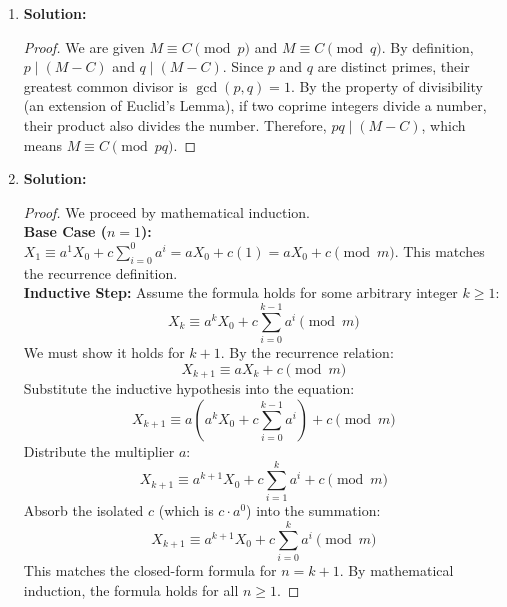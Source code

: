 \documentclass{article}
\begin{document}
\begin{enumerate}
\begin{proof}
        \begin{center}
        \end{center}
    \end{proof}

    \item \textbf{Solution:}
    \begin{proof}
        We are given $M \equiv C \pmod p$ and $M \equiv C \pmod q$. By definition, $p \mid (M - C)$ and $q \mid (M - C)$. Since $p$ and $q$ are distinct primes, their greatest common divisor is $\gcd(p, q) = 1$. By the property of divisibility (an extension of Euclid's Lemma), if two coprime integers divide a number, their product also divides the number. Therefore, $pq \mid (M - C)$, which means $M \equiv C \pmod{pq}$.
    \end{proof}

    \item \textbf{Solution:}
    \begin{proof}
        We proceed by mathematical induction. \\
        \textbf{Base Case ($n=1$):} $X_1 \equiv a^1 X_0 + c \sum_{i=0}^{0} a^i = aX_0 + c(1) = aX_0 + c \pmod m$. This matches the recurrence definition. \\
        \textbf{Inductive Step:} Assume the formula holds for some arbitrary integer $k \ge 1$:
        \[ X_k \equiv a^k X_0 + c \sum_{i=0}^{k-1} a^i \pmod m \]
        We must show it holds for $k+1$. By the recurrence relation:
        \[ X_{k+1} \equiv aX_k + c \pmod m \]
        Substitute the inductive hypothesis into the equation:
        \[ X_{k+1} \equiv a \left( a^k X_0 + c \sum_{i=0}^{k-1} a^i \right) + c \pmod m \]
        Distribute the multiplier $a$:
        \[ X_{k+1} \equiv a^{k+1} X_0 + c \sum_{i=1}^{k} a^i + c \pmod m \]
        Absorb the isolated $c$ (which is $c \cdot a^0$) into the summation:
        \[ X_{k+1} \equiv a^{k+1} X_0 + c \sum_{i=0}^{k} a^i \pmod m \]
        This matches the closed-form formula for $n = k+1$. By mathematical induction, the formula holds for all $n \ge 1$.
    \end{proof}


\end{enumerate}
\end{document}
